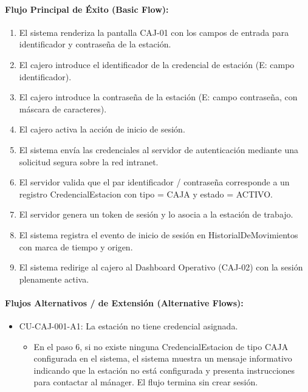\paragraph{Flujo Principal de Éxito (Basic Flow):}
\begin{enumerate}
    \item[I.] El sistema renderiza la pantalla CAJ-01 con los campos de entrada para identificador y contraseña de la estación.
    \item[II.] El cajero introduce el identificador de la credencial de estación (E: campo identificador).
    \item[III.] El cajero introduce la contraseña de la estación (E: campo contraseña, con máscara de caracteres).
    \item[IV.] El cajero activa la acción de inicio de sesión.
    \item[V.] El sistema envía las credenciales al servidor de autenticación mediante una solicitud segura sobre la red intranet.
    \item[VI.] El servidor valida que el par identificador / contraseña corresponde a un registro CredencialEstacion con tipo = CAJA y estado = ACTIVO.
    \item[VII.] El servidor genera un token de sesión y lo asocia a la estación de trabajo.
    \item[VIII.] El sistema registra el evento de inicio de sesión en HistorialDeMovimientos con marca de tiempo y origen.
    \item[IX.] El sistema redirige al cajero al Dashboard Operativo (CAJ-02) con la sesión plenamente activa.
\end{enumerate}

\paragraph{Flujos Alternativos / de Extensión (Alternative Flows):}
\begin{itemize}
    \item CU-CAJ-001-A1: La estación no tiene credencial asignada.
    \begin{itemize}
        \item En el paso 6, si no existe ninguna CredencialEstacion de tipo CAJA configurada en el sistema, el sistema muestra un mensaje informativo indicando que la estación no está configurada y presenta instrucciones para contactar al mánager. El flujo termina sin crear sesión.
    \end{itemize}
\end{itemize}

